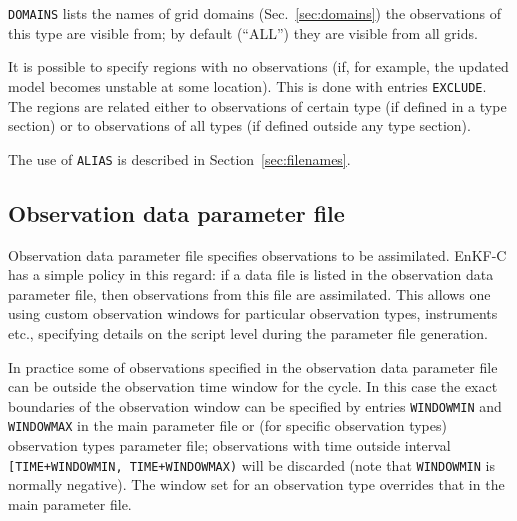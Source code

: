 \documentclass[11pt]{report}
\begin{document}
\verb|DOMAINS| lists the names of grid domains (Sec.~\ref{sec:domains}) the observations of this type are visible from; by default (``ALL'') they are visible from all grids.

It is possible to specify regions with no observations (if, for example, the updated model becomes unstable at some location).
This is done with entries \verb|EXCLUDE|.
The regions are related either to observations of certain type (if defined in
a type section) or to observations of all types (if defined outside any type
section).

The use of \verb|ALIAS| is described in Section~\ref{sec:filenames}.

\subsection{Observation data parameter file}

Observation data parameter file specifies observations to be assimilated.
EnKF-C has a simple policy in this regard: if a data file is listed in the observation data parameter file, then observations from this file are assimilated.
This allows one using custom observation windows for particular observation types, instruments etc., specifying details on the script level during the parameter file generation.

In practice some of observations specified in the observation data parameter file can be outside the observation time window for the cycle.
In this case the exact boundaries of the observation window can be specified by entries \verb|WINDOWMIN| and \verb|WINDOWMAX| in the main parameter file or (for specific observation types) observation types parameter file;
observations with time outside interval \verb|[TIME+WINDOWMIN, TIME+WINDOWMAX)| will be discarded (note that \verb|WINDOWMIN| is normally negative).
The window set for an observation type overrides that in the main parameter file.
\end{document}
